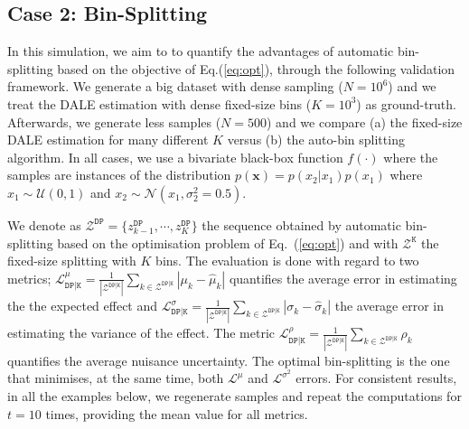 \documentclass[twoside]{article}
\begin{document}


\subsection{Case 2: Bin-Splitting}
\label{sec:simulation-examples-2}

In this simulation, we aim to to quantify the advantages of automatic
bin-splitting based on the objective of Eq.(\ref{eq:opt}), through the
following validation framework. We generate a big dataset with dense
sampling (\(N=10^6\)) and we treat the DALE estimation with dense
fixed-size bins (\(K=10^3\)) as ground-truth. Afterwards, we generate
less samples (\(N=500\)) and we compare (a) the fixed-size DALE
estimation for many different \(K\) versus (b) the auto-bin splitting
algorithm. In all cases, we use a bivariate black-box function
\(f(\cdot)\) where the samples are instances of the distribution
\(p(\mathbf{x}) = p(x_2|x_1)p(x_1)\) where
\(x_1 \sim \mathcal{U}(0,1)\) and
\(x_2 \sim \mathcal{N}(x_1, \sigma_2^2=0.5)\).

We denote as
\(\mathcal{Z^{\mathtt{DP}}} = \{z^{\mathtt{DP}}_{k-1}, \cdots,
z^{\mathtt{DP}}_{K}\}\) the sequence obtained by automatic
bin-splitting based on the optimisation problem of Eq.~(\ref{eq:opt})
and with \(\mathcal{Z^{\mathtt{K}}}\) the fixed-size splitting with
\(K\) bins. The evaluation is done with regard to two metrics;
\(\mathcal{L}_{\mathtt{DP|K}}^{\mu} =
\frac{1}{|\mathcal{Z}^{\mathtt{DP|K}}|} \sum_{k \in
  \mathcal{Z}^{\mathtt{DP|K}}} | \mu_k - \hat{\mu}_k | \) quantifies
the average error in estimating the the expected effect and
\(\mathcal{L}_{\mathtt{DP|K}}^{\sigma} =
\frac{1}{|\mathcal{Z}^{\mathtt{DP|K}}|} \sum_{k \in
  \mathcal{Z}^{\mathtt{DP|K}}} | \sigma_k - \hat{\sigma}_k | \)
the average error in estimating the variance of the effect. The metric
\(\mathcal{L}^{\rho}_{\mathtt{DP|K}} =
\frac{1}{|\mathcal{Z}^{\mathtt{DP|K}}|} \sum_{k \in
  \mathcal{Z}^{\mathtt{DP|K}}} \rho_k \) quantifies the average
nuisance uncertainty. The optimal bin-splitting is the one that
minimises, at the same time, both \(\mathcal{L}^{\mu}\) and
\(\mathcal{L}^{\sigma^2}\) errors. For consistent results, in all the
examples below, we regenerate samples and repeat the computations for
\(t = 10\) times, providing the mean value for all metrics.
\end{document}
